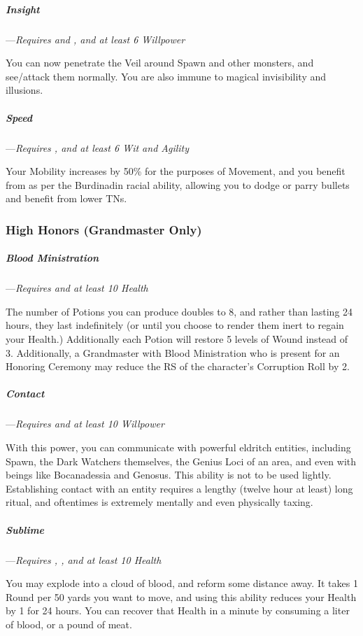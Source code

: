 \documentclass[oneside,11pt,english]{book}
\begin{document}
\subparagraph{Insight}\label{honor:Insight}
---\quad \emph{Requires  and , and at least 6 Willpower}

You can now penetrate the Veil 
around Spawn and other monsters, and see/attack them normally. You are also immune to 
magical invisibility and illusions. 

\subparagraph{Speed}\label{honor:Speed}
---\quad \emph{Requires , and at least 6 Wit and Agility}

Your Mobility increases by 50\% for the 
purposes of Movement, and you benefit from  as per the Burdinadin racial ability, 
allowing you to dodge or parry bullets and benefit from lower TNs. 

\subsubsection{High Honors (Grandmaster Only)}
\subparagraph{Blood Ministration}\label{honor:Blood Ministration}
---\quad \emph{Requires  and at least 10 Health}

The number of Potions you can produce doubles to 8, and rather than lasting 24 hours, they last indefinitely (or until you 
choose to render them inert to regain your Health.) Additionally each Potion will restore 5 levels of Wound instead of 3.
Additionally, a Grandmaster with Blood Ministration who is present for an 
Honoring Ceremony may reduce the RS of the character’s Corruption Roll by 2. 

\subparagraph{Contact}\label{honor:Contact}
---\quad \emph{Requires  and at least 10 Willpower}

With this power, you can communicate
with powerful eldritch entities, including Spawn, the Dark Watchers themselves, the Genius Loci 
of an area, and even with beings like Bocanadessia and Genosus. 
This ability is not to be used lightly. Establishing contact with an entity requires a lengthy (twelve 
hour at least) long ritual, and oftentimes is extremely mentally and even physically taxing.

\subparagraph{Sublime}\label{honor:Sublime}
---\quad \emph{Requires , , and at least 10 Health}

You may explode into a cloud 
of blood, and reform some distance away. It takes 1 Round per 50 yards you want to move, and 
using this ability reduces your Health by 1 for 24 hours. You can recover that Health in a minute 
by consuming a liter of blood, or a pound of meat. 
\end{document}
